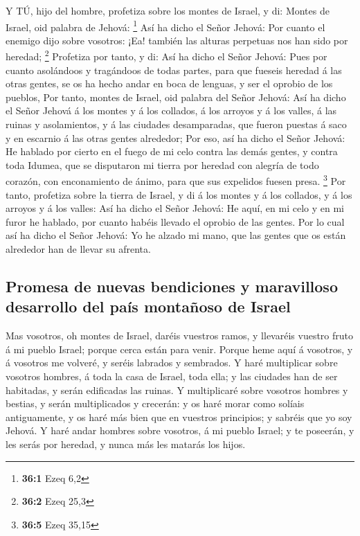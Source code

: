  Y TÚ, hijo del hombre, profetiza sobre los montes de
Israel, y di: Montes de Israel, oid palabra de Jehová: \footnote{\textbf{36:1}
  Ezeq 6,2}  Así ha dicho el Señor Jehová: Por cuanto el
enemigo dijo sobre vosotros: ¡Ea! también las alturas perpetuas nos han
sido por heredad; \footnote{\textbf{36:2} Ezeq 25,3} 
Profetiza por tanto, y di: Así ha dicho el Señor Jehová: Pues por cuanto
asolándoos y tragándoos de todas partes, para que fueseis heredad á las
otras gentes, se os ha hecho andar en boca de lenguas, y ser el oprobio
de los pueblos,  Por tanto, montes de Israel, oid palabra
del Señor Jehová: Así ha dicho el Señor Jehová á los montes y á los
collados, á los arroyos y á los valles, á las ruinas y asolamientos, y á
las ciudades desamparadas, que fueron puestas á saco y en escarnio á las
otras gentes alrededor;  Por eso, así ha dicho el Señor
Jehová: He hablado por cierto en el fuego de mi celo contra las demás
gentes, y contra toda Idumea, que se disputaron mi tierra por heredad
con alegría de todo corazón, con enconamiento de ánimo, para que sus
expelidos fuesen presa. \footnote{\textbf{36:5} Ezeq 35,15} 
Por tanto, profetiza sobre la tierra de Israel, y di á los montes y á
los collados, y á los arroyos y á los valles: Así ha dicho el Señor
Jehová: He aquí, en mi celo y en mi furor he hablado, por cuanto habéis
llevado el oprobio de las gentes.  Por lo cual así ha dicho
el Señor Jehová: Yo he alzado mi mano, que las gentes que os están
alrededor han de llevar su afrenta.

\hypertarget{promesa-de-nuevas-bendiciones-y-maravilloso-desarrollo-del-pauxeds-montauxf1oso-de-israel}{%
\subsection{Promesa de nuevas bendiciones y maravilloso desarrollo del
país montañoso de
Israel}\label{promesa-de-nuevas-bendiciones-y-maravilloso-desarrollo-del-pauxeds-montauxf1oso-de-israel}}

 Mas vosotros, oh montes de Israel, daréis vuestros ramos, y
llevaréis vuestro fruto á mi pueblo Israel; porque cerca están para
venir.  Porque heme aquí á vosotros, y á vosotros me
volveré, y seréis labrados y sembrados.  Y haré multiplicar
sobre vosotros hombres, á toda la casa de Israel, toda ella; y las
ciudades han de ser habitadas, y serán edificadas las ruinas.
 Y multiplicaré sobre vosotros hombres y bestias, y serán
multiplicados y crecerán: y os haré morar como solíais antiguamente, y
os haré más bien que en vuestros principios; y sabréis que yo soy
Jehová.  Y haré andar hombres sobre vosotros, á mi pueblo
Israel; y te poseerán, y les serás por heredad, y nunca más les matarás
los hijos.

